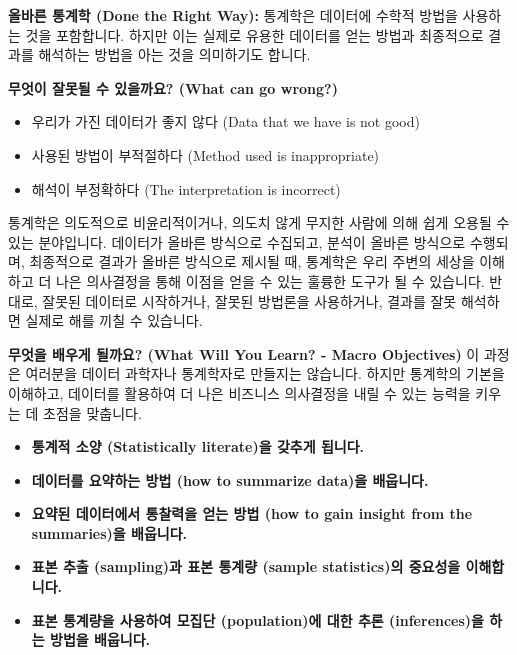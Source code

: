 \documentclass[11pt,a4paper]{article}
\theoremstyle{definition}
\begin{document}
\begin{tcolorbox}[title={그렇다면 통계학이란 무엇일까요? (So What is Statistics?)}]
\textbf{올바른 통계학 (Done the Right Way):}
통계학은 데이터에 수학적 방법을 사용하는 것을 포함합니다. 하지만 이는 실제로 유용한 데이터를 얻는 방법과 최종적으로 결과를 해석하는 방법을 아는 것을 의미하기도 합니다.

\textbf{무엇이 잘못될 수 있을까요? (What can go wrong?)}
\begin{itemize}
    \item 우리가 가진 데이터가 좋지 않다 (Data that we have is not good)
    \item 사용된 방법이 부적절하다 (Method used is inappropriate)
    \item 해석이 부정확하다 (The interpretation is incorrect)
\end{itemize}
통계학은 의도적으로 비윤리적이거나, 의도치 않게 무지한 사람에 의해 쉽게 오용될 수 있는 분야입니다. 데이터가 올바른 방식으로 수집되고, 분석이 올바른 방식으로 수행되며, 최종적으로 결과가 올바른 방식으로 제시될 때, 통계학은 우리 주변의 세상을 이해하고 더 나은 의사결정을 통해 이점을 얻을 수 있는 훌륭한 도구가 될 수 있습니다. 반대로, 잘못된 데이터로 시작하거나, 잘못된 방법론을 사용하거나, 결과를 잘못 해석하면 실제로 해를 끼칠 수 있습니다.
\end{tcolorbox}

\begin{summarybox}
\textbf{무엇을 배우게 될까요? (What Will You Learn? - Macro Objectives)}
이 과정은 여러분을 데이터 과학자나 통계학자로 만들지는 않습니다. 하지만 통계학의 기본을 이해하고, 데이터를 활용하여 더 나은 비즈니스 의사결정을 내릴 수 있는 능력을 키우는 데 초점을 맞춥니다.

\begin{itemize}
    \item \textbf{통계적 소양 (Statistically literate)을 갖추게 됩니다.}
    \item \textbf{데이터를 요약하는 방법 (how to summarize data)을 배웁니다.}
    \item \textbf{요약된 데이터에서 통찰력을 얻는 방법 (how to gain insight from the summaries)을 배웁니다.}
    \item \textbf{표본 추출 (sampling)과 표본 통계량 (sample statistics)의 중요성을 이해합니다.}
    \item \textbf{표본 통계량을 사용하여 모집단 (population)에 대한 추론 (inferences)을 하는 방법을 배웁니다.}
\end{itemize}
\end{summarybox}
\end{document}
